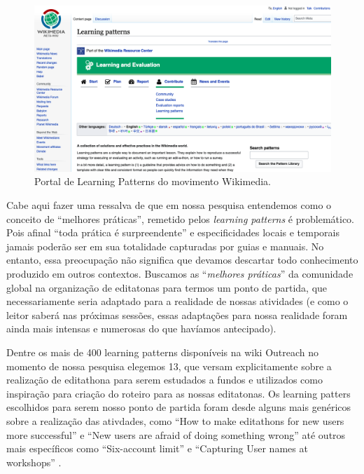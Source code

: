 \begin{figure}[H]
    \centering
    \includegraphics[width=1\textwidth]{Images/learning_patterns.png}
    \caption{Portal de Learning Patterns do movimento Wikimedia.}
    \label{fig:learning_patterns}
\end{figure}

Cabe aqui fazer uma ressalva de que em nossa pesquisa entendemos como o conceito de ``melhores práticas'', remetido pelos \textit{learning patterns} é problemático. Pois afinal ``toda prática é surpreendente'' \citep{cukierman_pasteur_2007} e especificidades locais e temporais jamais poderão ser em sua totalidade capturadas por guias e manuais. No entanto, essa preocupação não significa que devamos descartar todo conhecimento produzido em outros contextos. Buscamos as ``\textit{melhores práticas}'' da comunidade global na organização de editatonas para termos um ponto de partida, que necessariamente seria adaptado para a realidade de nossas atividades (e como o leitor saberá nas próximas sessões, essas adaptações para nossa realidade foram ainda mais intensas e numerosas do que havíamos antecipado).

Dentre os mais de 400 learning patterns disponíveis na wiki Outreach no momento de nossa pesquisa elegemos 13, que versam explicitamente sobre a realização de editathona para serem estudados a fundos e utilizados como inspiração para criação do roteiro para as nossas editatonas. Os learning patters escolhidos para serem nosso ponto de partida foram desde alguns mais genéricos sobre a realização das ativdades, como ``How to make editathons for new users more successful''  e ``New users are afraid of doing something wrong''  até outros mais específicos como ``Six-account limit''  e ``Capturing User names at workshops'' . 

